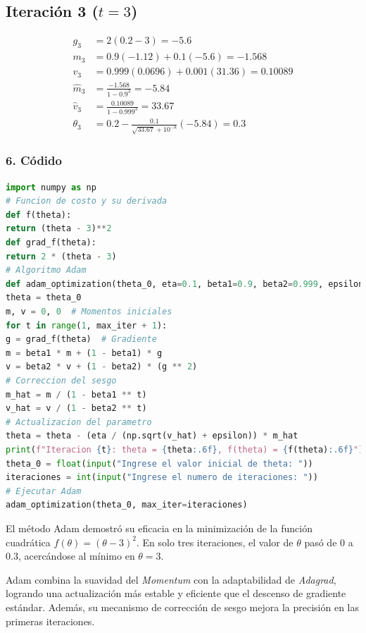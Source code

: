\documentclass{article}
\begin{document}
\subsection*{Iteración 3 ($t=3$)}
\begin{align*}
	g_3 &= 2(0.2 - 3) = -5.6 \\
	m_3 &= 0.9(-1.12) + 0.1(-5.6) = -1.568 \\
	v_3 &= 0.999(0.0696) + 0.001(31.36) = 0.10089 \\
	\hat{m}_3 &= \frac{-1.568}{1 - 0.9^3} = -5.84 \\
	\hat{v}_3 &= \frac{0.10089}{1 - 0.999^3} = 33.67 \\
	\theta_3 &= 0.2 - \frac{0.1}{\sqrt{33.67} + 10^{-8}} (-5.84) = 0.3
\end{align*}

\subsubsection*{6. Códido}
\begin{lstlisting}[language=Python, caption=Adaptive Moment Estimation, frame=single]
import numpy as np
# Funcion de costo y su derivada
def f(theta):
return (theta - 3)**2
def grad_f(theta):
return 2 * (theta - 3)
# Algoritmo Adam
def adam_optimization(theta_0, eta=0.1, beta1=0.9, beta2=0.999, epsilon=1e-8, max_iter=5):
theta = theta_0
m, v = 0, 0  # Momentos iniciales
for t in range(1, max_iter + 1):
g = grad_f(theta)  # Gradiente
m = beta1 * m + (1 - beta1) * g
v = beta2 * v + (1 - beta2) * (g ** 2)
# Correccion del sesgo
m_hat = m / (1 - beta1 ** t)
v_hat = v / (1 - beta2 ** t)
# Actualizacion del parametro
theta = theta - (eta / (np.sqrt(v_hat) + epsilon)) * m_hat
print(f"Iteracion {t}: theta = {theta:.6f}, f(theta) = {f(theta):.6f}")
theta_0 = float(input("Ingrese el valor inicial de theta: "))
iteraciones = int(input("Ingrese el numero de iteraciones: "))
# Ejecutar Adam
adam_optimization(theta_0, max_iter=iteraciones)
\end{lstlisting}

El método Adam demostró su eficacia en la minimización de la función cuadrática \( f(\theta) = (\theta - 3)^2 \). En solo tres iteraciones, el valor de \( \theta \) pasó de \( 0 \) a \( 0.3 \), acercándose al mínimo en \( \theta = 3 \).

Adam combina la suavidad del \textit{Momentum} con la adaptabilidad de \textit{Adagrad}, logrando una actualización más estable y eficiente que el descenso de gradiente estándar. Además, su mecanismo de corrección de sesgo mejora la precisión en las primeras iteraciones.
\end{document}
